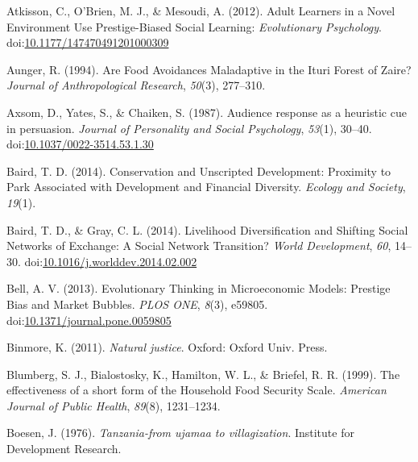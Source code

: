 \documentclass[
  11pt,
]{article}
\begin{document}
\leavevmode\hypertarget{ref-atkissonAdultLearnersNovel2012}{}%
Atkisson, C., O'Brien, M. J., \& Mesoudi, A. (2012). Adult Learners in a
Novel Environment Use Prestige-Biased Social Learning:
\emph{Evolutionary Psychology}.
doi:\href{https://doi.org/10.1177/147470491201000309}{10.1177/147470491201000309}

\leavevmode\hypertarget{ref-aungerAreFoodAvoidances1994}{}%
Aunger, R. (1994). Are Food Avoidances Maladaptive in the Ituri Forest
of Zaire? \emph{Journal of Anthropological Research}, \emph{50}(3),
277--310.

\leavevmode\hypertarget{ref-axsomAudienceResponseHeuristic1987}{}%
Axsom, D., Yates, S., \& Chaiken, S. (1987). Audience response as a
heuristic cue in persuasion. \emph{Journal of Personality and Social
Psychology}, \emph{53}(1), 30--40.
doi:\href{https://doi.org/10.1037/0022-3514.53.1.30}{10.1037/0022-3514.53.1.30}

\leavevmode\hypertarget{ref-bairdConservationUnscriptedDevelopment2014}{}%
Baird, T. D. (2014). Conservation and Unscripted Development: Proximity
to Park Associated with Development and Financial Diversity.
\emph{Ecology and Society}, \emph{19}(1).

\leavevmode\hypertarget{ref-bairdLivelihoodDiversificationShifting2014a}{}%
Baird, T. D., \& Gray, C. L. (2014). Livelihood Diversification and
Shifting Social Networks of Exchange: A Social Network Transition?
\emph{World Development}, \emph{60}, 14--30.
doi:\href{https://doi.org/10.1016/j.worlddev.2014.02.002}{10.1016/j.worlddev.2014.02.002}

\leavevmode\hypertarget{ref-bellEvolutionaryThinkingMicroeconomic2013}{}%
Bell, A. V. (2013). Evolutionary Thinking in Microeconomic Models:
Prestige Bias and Market Bubbles. \emph{PLOS ONE}, \emph{8}(3), e59805.
doi:\href{https://doi.org/10.1371/journal.pone.0059805}{10.1371/journal.pone.0059805}

\leavevmode\hypertarget{ref-binmoreNaturalJustice2011}{}%
Binmore, K. (2011). \emph{Natural justice}. Oxford: Oxford Univ. Press.

\leavevmode\hypertarget{ref-blumbergEffectivenessShortForm1999a}{}%
Blumberg, S. J., Bialostosky, K., Hamilton, W. L., \& Briefel, R. R.
(1999). The effectiveness of a short form of the Household Food Security
Scale. \emph{American Journal of Public Health}, \emph{89}(8),
1231--1234.

\leavevmode\hypertarget{ref-boesen1976tanzania}{}%
Boesen, J. (1976). \emph{Tanzania-from ujamaa to villagization}.
Institute for Development Research.
\end{document}
